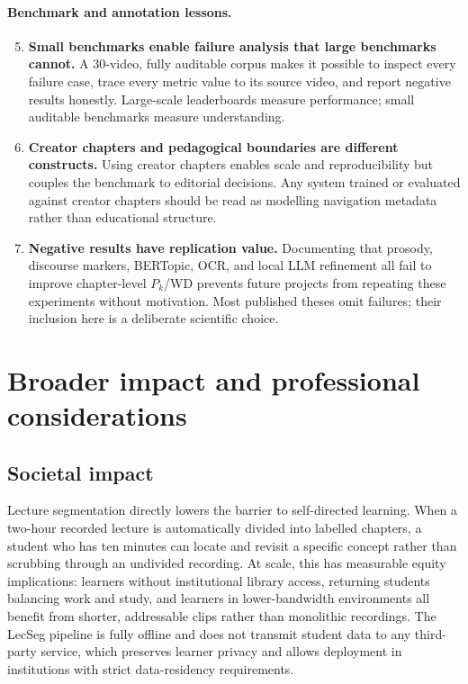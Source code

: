 \paragraph{Benchmark and annotation lessons.}
\begin{enumerate}
  \setcounter{enumi}{4}
  \item \textbf{Small benchmarks enable failure analysis that large benchmarks
    cannot.}
    A 30-video, fully auditable corpus makes it possible to inspect every
    failure case, trace every metric value to its source video, and report
    negative results honestly.
    Large-scale leaderboards measure performance; small auditable benchmarks
    measure understanding.

  \item \textbf{Creator chapters and pedagogical boundaries are different
    constructs.}
    Using creator chapters enables scale and reproducibility but couples the
    benchmark to editorial decisions.
    Any system trained or evaluated against creator chapters should be read
    as modelling navigation metadata rather than educational structure.

  \item \textbf{Negative results have replication value.}
    Documenting that prosody, discourse markers, BERTopic, OCR, and local LLM
    refinement all fail to improve chapter-level $P_k$/WD prevents future
    projects from repeating these experiments without motivation.
    Most published theses omit failures; their inclusion here is a deliberate
    scientific choice.
\end{enumerate}

\section{Broader impact and professional considerations}
\label{sec:broader_impact}

\subsection*{Societal impact}

Lecture segmentation directly lowers the barrier to self-directed learning.
When a two-hour recorded lecture is automatically divided into labelled chapters,
a student who has ten minutes can locate and revisit a specific concept rather
than scrubbing through an undivided recording.
At scale, this has measurable equity implications: learners without institutional
library access, returning students balancing work and study, and learners in
lower-bandwidth environments all benefit from shorter, addressable clips rather
than monolithic recordings.
The LecSeg pipeline is fully offline and does not transmit student data to any
third-party service, which preserves learner privacy and allows deployment in
institutions with strict data-residency requirements.

